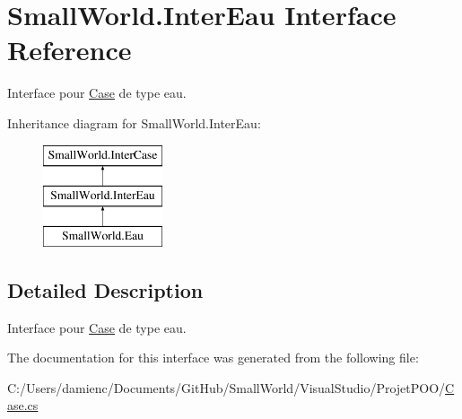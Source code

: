 \hypertarget{interface_small_world_1_1_inter_eau}{\section{Small\-World.\-Inter\-Eau Interface Reference}
\label{interface_small_world_1_1_inter_eau}
}


Interface pour \hyperlink{class_small_world_1_1_case}{Case} de type eau.  


Inheritance diagram for Small\-World.\-Inter\-Eau\-:\begin{figure}[H]
\begin{center}
\leavevmode
\includegraphics[height=3.000000cm]{interface_small_world_1_1_inter_eau}
\end{center}
\end{figure}


\subsection{Detailed Description}
Interface pour \hyperlink{class_small_world_1_1_case}{Case} de type eau. 

The documentation for this interface was generated from the following file\-:\begin{DoxyCompactItemize}
\item 
C\-:/\-Users/damienc/\-Documents/\-Git\-Hub/\-Small\-World/\-Visual\-Studio/\-Projet\-P\-O\-O/\hyperlink{_case_8cs}{Case.\-cs}\end{DoxyCompactItemize}
